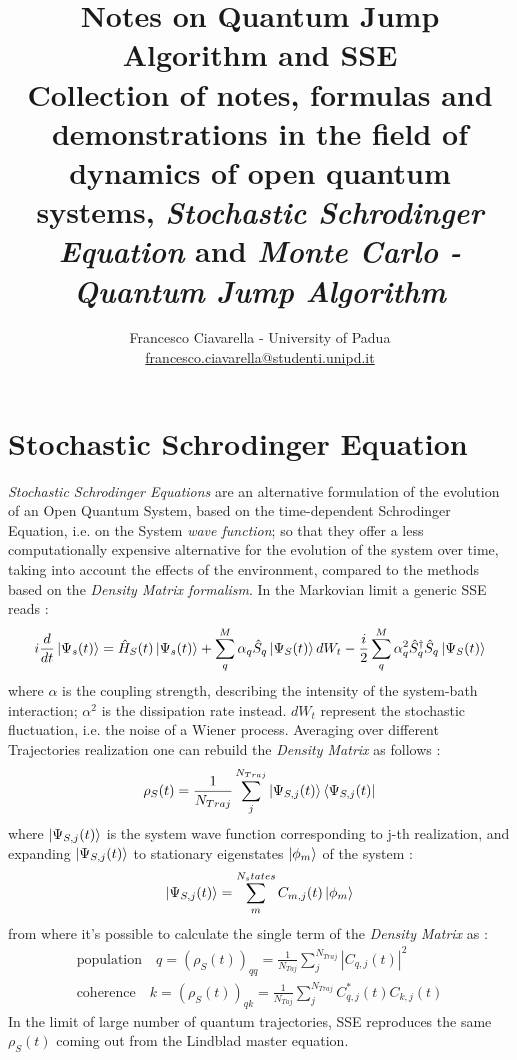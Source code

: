 \documentclass[a4paper,12pt]{article}
\title{
	\vspace{2cm}
	\Huge \textbf{Notes on Quantum Jump Algorithm and SSE } \\[0.5cm]
	\large Collection of notes, formulas and demonstrations in the field of dynamics of open quantum systems, \textit{Stochastic Schrodinger Equation} and \textit{Monte Carlo - Quantum Jump Algorithm}
	\vspace{5cm}
}
\author{\Large Francesco Ciavarella - University of Padua \\[10pt] \href{mailto:francesco.ciavarella@studenti.unipd.it}{francesco.ciavarella@studenti.unipd.it}}
\begin{document}
	
	\maketitle
	\thispagestyle{empty}
	\newpage
	
	\tableofcontents
	\newpage
	
	\section{Stochastic Schrodinger Equation}
	\label{sec:SSE}
	\textit{Stochastic Schrodinger Equations} are an alternative formulation of the evolution of an Open Quantum System, based on the time-dependent Schrodinger Equation, i.e. on the System\textit{ wave function}; so that they offer a less computationally expensive alternative for the evolution of the system over time, taking into account the effects of the environment, compared to the methods based on the \textit{Density Matrix formalism}.
	In the Markovian limit a generic SSE reads : 
	\begin{equation}
		i \frac{d}{dt} \ket{\Psi_{s}(t)} = \hat{H}_{S}(t)\ket{\Psi_{s}(t)} + \sum_{q}^{M}{\alpha_{q} \hat{S}_{q} \ket{\Psi_{S}(t)} dW_{t}} - \frac{i}{2} \sum_{q}^{M} {\alpha^{2}_{q} \hat{S}^{\dagger}_{q} \hat{S}_{q} \ket{\Psi_{S}(t)} }
		\label{eq:generic_Diffusive_SSE}
	\end{equation}
	where $ \alpha $ is the coupling strength, describing the intensity of the system-bath interaction; $ \alpha^{2} $ is the dissipation rate instead. $ dW_{t} $ represent the stochastic fluctuation, i.e. the noise of a Wiener process.
	Averaging over different Trajectories realization one can rebuild the \textit{Density Matrix} as follows : 
	\begin{equation}
		\rho_{S} (t) = \frac{1}{N_{Traj}} \sum^{N_{Traj}}_{j}{\ket{\Psi_{S,j}(t)} \bra{\Psi_{S,j}(t)}}
	\end{equation}
	where $ \ket{\Psi_{S,j}(t)} $ is the system wave function corresponding to j-th realization, and expanding $ \ket{\Psi_{S,j}(t)} $ to stationary eigenstates $ \ket{\phi_{m}} $ of the system : 
	\begin{gather}
		\ket{\Psi_{S,j}(t)} = \sum_{m}^{N_states}{C_{m,j}(t) \ket{\phi_{m}}}
	\end{gather}
	from where it's possible to calculate the single term of the \textit{Density Matrix} as :
	\begin{align}
		\text{population} \quad q = \left(\rho_{S}(t)\right)_{qq} = \frac{1}{N_{Taj}} \sum_{j}^{N_{Traj}}{\left|  C_{q,j}(t) \right|^{2}} \\
		\text{coherence} \quad k = \left(\rho_{S}(t)\right)_{qk} = \frac{1}{N_{Taj}} \sum_{j}^{N_{Traj}}{ C^{*}_{q,j}(t)C_{k,j}(t)}
	\end{align}
	In the limit of large number of quantum trajectories, SSE reproduces the same $ \rho_{S}(t) $ coming out from the Lindblad master equation.
	
\end{document}
